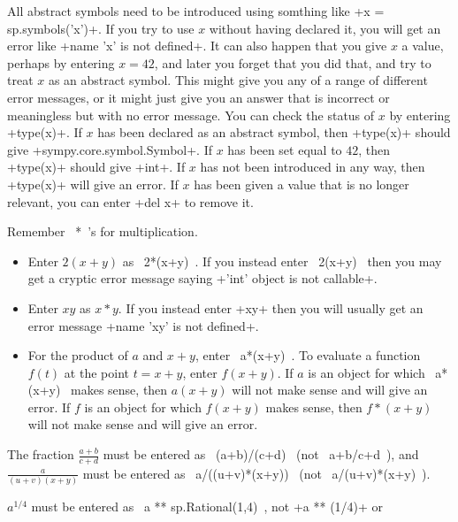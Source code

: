 \documentclass[a4paper,10pt]{amsbook}
\begin{document}
\begin{secenum}
 \item\label{symbolsagain} All abstract symbols need to be introduced using somthing
    like \pcode+x = sp.symbols('x')+.  If you try to use $x$ without
    having declared it, you will get an error like
    \pcode+name 'x' is not defined+.  It can also happen that you give
    $x$ a value, perhaps by entering $x = 42$, and later you forget
    that you did that, and try to treat $x$ as an abstract symbol.  
    This might give you any of a range of different error messages, or
    it might just give you an answer that is incorrect or meaningless
    but with no error message.  You can check the status of $x$ by
    entering \pcode+type(x)+.  If $x$ has been declared as an abstract
    symbol, then \pcode+type(x)+ should give
    \pcode+sympy.core.symbol.Symbol+.  If $x$ has been set equal to
    $42$, then \pcode+type(x)+ should give \pcode+int+.  If $x$ has
    not been introduced in any way, then \pcode+type(x)+ will give an
    error.  If $x$ has been given a value that is no longer relevant,
    you can enter \pcode+del x+ to remove it.
%
 \item\label{rememberstar} Remember \pcode~*~'s for multiplication.  
  \begin{itemize}
   \item Enter $2(x+y)$ as \pcode~2*(x+y)~.  If you instead enter 
    \pcode~2(x+y)~ then you may get a cryptic error message saying 
    \pcode+'int' object is not callable+.
   \item Enter $xy$ as $x*y$.  If you instead enter \pcode+xy+ then
    you will usually get an error message
    \pcode+name 'xy' is not defined+.
   \item For the product of $a$ and $x+y$, enter \pcode~a*(x+y)~.
    To evaluate a function $f(t)$ at the point $t=x+y$, enter
    $f(x+y)$.  If $a$ is an object for which \pcode~a*(x+y)~ makes
    sense, then $a(x+y)$ will not make sense and will give an error.
    If $f$ is an object for which $f(x+y)$ makes sense, then $f*(x+y)$
    will not make sense and will give an error.
  \end{itemize}
%
 \item\label{fracbrac} The fraction $\frac{a+b}{c+d}$ must be entered as
  \pcode~(a+b)/(c+d)~ (not \pcode~a+b/c+d~), and
   $\frac{a}{(u+v)(x+y)}$ must be entered as
   \pcode~a/((u+v)*(x+y))~ (not \pcode~a/(u+v)*(x+y)~). 
%
 \item\label{expbrac} $a^{1/4}$ must be entered as
  \pcode~a ** sp.Rational(1,4)~, not \pcode+a ** (1/4)+ or

\end{secenum}
\end{document}
